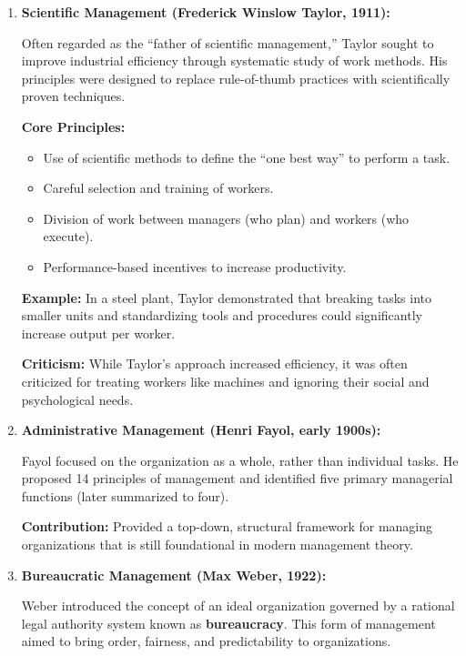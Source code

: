 \documentclass[12pt,a4paper]{book}
\begin{document}
\begin{enumerate}
    \item \textbf{Scientific Management (Frederick Winslow Taylor, 1911):}

    Often regarded as the “father of scientific management,” Taylor sought to improve industrial efficiency through systematic study of work methods. His principles were designed to replace rule-of-thumb practices with scientifically proven techniques.

    \textbf{Core Principles:}
    \begin{itemize}
        \item Use of scientific methods to define the “one best way” to perform a task.
        \item Careful selection and training of workers.
        \item Division of work between managers (who plan) and workers (who execute).
        \item Performance-based incentives to increase productivity.
    \end{itemize}

    \textbf{Example:} In a steel plant, Taylor demonstrated that breaking tasks into smaller units and standardizing tools and procedures could significantly increase output per worker.

    \textbf{Criticism:} While Taylor’s approach increased efficiency, it was often criticized for treating workers like machines and ignoring their social and psychological needs.

    \item \textbf{Administrative Management (Henri Fayol, early 1900s):}

    Fayol focused on the organization as a whole, rather than individual tasks. He proposed 14 principles of management and identified five primary managerial functions (later summarized to four).

    \textbf{Contribution:} Provided a top-down, structural framework for managing organizations that is still foundational in modern management theory.

    \item \textbf{Bureaucratic Management (Max Weber, 1922):}

    Weber introduced the concept of an ideal organization governed by a rational legal authority system known as \textbf{bureaucracy}. This form of management aimed to bring order, fairness, and predictability to organizations.


\end{enumerate}
\end{document}
